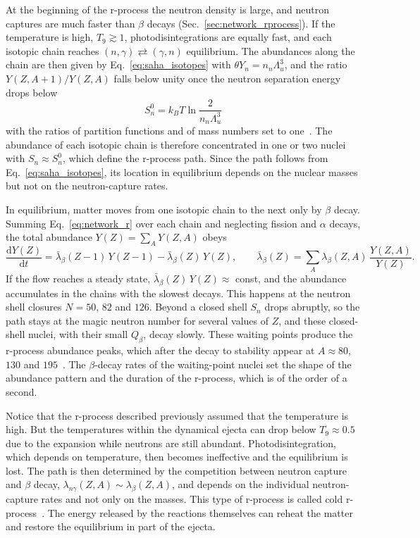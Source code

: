 At the beginning of the r-process the neutron density is large, and neutron captures are much faster than $\beta$ decays (Sec.~\ref{sec:network_rprocess}).
If the temperature is high, $T_9\gtrsim1$, photodisintegrations are equally fast, and each isotopic chain reaches $(n,\gamma)\rightleftarrows(\gamma,n)$ equilibrium.
The abundances along the chain are then given by Eq.~\ref{eq:saha_isotopes} with $\theta Y_n=n_n\Lambda_u^3$, and the ratio $Y(Z,A+1)/Y(Z,A)$ falls below unity once the neutron separation energy drops below
\begin{equation}\label{eq:Sn0}
  S_n^0=k_BT\ln\frac{2}{n_n\Lambda_u^3}
\end{equation}
with the ratios of partition functions and of mass numbers set to one~\cite{cowan_r-process_1991}.
The abundance of each isotopic chain is therefore concentrated in one or two nuclei with $S_n\approx S_n^0$, which define the r-process path.
Since the path follows from Eq.~\ref{eq:saha_isotopes}, its location in equilibrium depends on the nuclear masses but not on the neutron-capture rates.
 
In equilibrium, matter moves from one isotopic chain to the next only by $\beta$ decay.
Summing Eq.~\ref{eq:network_r} over each chain and neglecting fission and $\alpha$ decays, the total abundance $Y(Z)=\sum_AY(Z,A)$ obeys
\begin{equation}\label{eq:beta_flow}
  \frac{\mathrm{d}Y(Z)}{\mathrm{d}t}=\bar\lambda_\beta(Z-1)\,Y(Z-1)-\bar\lambda_\beta(Z)\,Y(Z),\qquad \bar\lambda_\beta(Z)=\sum_A\lambda_\beta(Z,A)\,\frac{Y(Z,A)}{Y(Z)} .
\end{equation}
If the flow reaches a steady state, $\bar\lambda_\beta(Z)\,Y(Z)\approx$ const, and the abundance accumulates in the chains with the slowest decays.
This happens at the neutron shell closures $N=50$, $82$ and $126$.
Beyond a closed shell $S_n$ drops abruptly, so the path stays at the magic neutron number for several values of $Z$, and these closed-shell nuclei, with their small $Q_\beta$, decay slowly.
These waiting points produce the r-process abundance peaks, which after the decay to stability appear at $A\approx80$, $130$ and $195$~\cite{cowan_r-process_1991,arnould_r-process_2007}.
The $\beta$-decay rates of the waiting-point nuclei set the shape of the abundance pattern and the duration of the r-process, which is of the order of a second.
 
Notice that the r-process described previously assumed that the temperature is high.
But the temperatures within the dynamical ejecta can drop below $T_9\approx0.5$ due to the expansion while neutrons are still abundant.
Photodisintegration, which depends on temperature, then becomes ineffective and the equilibrium is lost.
The path is then determined by the competition between neutron capture and $\beta$ decay, $\lambda_{n\gamma}(Z,A)\sim\lambda_\beta(Z,A)$, and depends on the individual neutron-capture rates and not only on the masses.
This type of r-process is called cold r-process~\cite{wanajo_cold_2007,arcones_dynamical_2011}.
The energy released by the reactions themselves can reheat the matter and restore the equilibrium in part of the ejecta.

